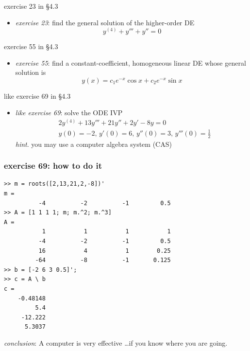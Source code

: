 \documentclass{beamer}
\begin{document}
\begin{frame}{exercise 23 in \S4.3}

\begin{itemize}
\item \emph{exercise 23}:  find the general solution of the higher-order DE
    $$y^{(4)} + y''' + y'' = 0$$
\end{itemize}

\vspace{60mm}
\end{frame}


\begin{frame}{exercise 55 in \S4.3}

\begin{itemize}
\item \emph{exercise 55}:  find a constant-coefficient, homogeneous linear DE whose general solution is
    $$y(x) = c_1 e^{-x} \cos x + c_2 e^{-x} \sin x$$
\end{itemize}

\vspace{60mm}
\end{frame}


\begin{frame}{like exercise 69 in \S4.3}

\begin{itemize}
\item \emph{like exercise 69}:  solve the ODE IVP
\begin{align*}
& 2 y^{(4)} + 13 y''' + 21 y'' + 2 y' - 8 y = 0 \\
& y(0)=-2, \, y'(0)=6, \, y''(0)=3, \, y'''(0)=\tfrac{1}{2}
\end{align*}
\emph{hint}.  you may use a computer algebra system (CAS)
\end{itemize}

\vspace{50mm}
\end{frame}


\begin{frame}[fragile]
\frametitle{exercise 69: how to do it}

\begin{Verbatim}[fontsize=\footnotesize]
>> m = roots([2,13,21,2,-8])'
m =
          -4          -2          -1         0.5
>> A = [1 1 1 1; m; m.^2; m.^3]
A =
           1           1           1           1
          -4          -2          -1         0.5
          16           4           1        0.25
         -64          -8          -1       0.125
>> b = [-2 6 3 0.5]';
>> c = A \ b
c =
    -0.48148
         5.4
     -12.222
      5.3037
\end{Verbatim}

\footnotesize \alert{\emph{conclusion}:  A computer is very effective \dots if you know where you are going.}
\end{frame}
\end{document}
